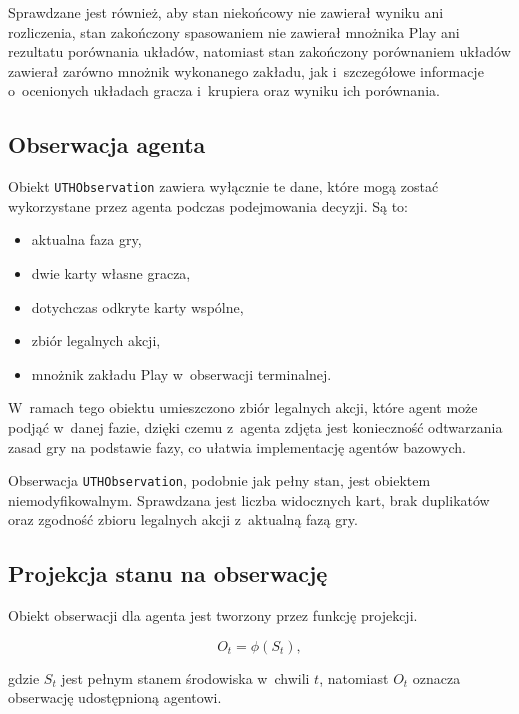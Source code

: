 Sprawdzane jest również, aby stan
niekońcowy nie zawierał wyniku ani rozliczenia, stan zakończony spasowaniem
nie zawierał mnożnika Play ani rezultatu porównania układów, natomiast stan
zakończony porównaniem układów zawierał zarówno mnożnik wykonanego zakładu,
jak i~szczegółowe informacje o~ocenionych układach gracza i~krupiera oraz wyniku ich porównania.

\subsection{Obserwacja agenta}
\label{subsec:uth-observation}

Obiekt \texttt{UTHObservation} zawiera wyłącznie te dane, które mogą zostać
wykorzystane przez agenta podczas podejmowania decyzji. Są to:

\begin{itemize}
    \item aktualna faza gry,
    \item dwie karty własne gracza,
    \item dotychczas odkryte karty wspólne,
    \item zbiór legalnych akcji,
    \item mnożnik zakładu Play w~obserwacji terminalnej.
\end{itemize}

W~ramach tego obiektu umieszczono zbiór legalnych akcji, które agent może podjąć w~danej fazie,
dzięki czemu z~agenta zdjęta jest konieczność odtwarzania zasad gry na podstawie fazy, co
ułatwia implementację agentów bazowych.

Obserwacja \texttt{UTHObservation}, podobnie jak pełny stan, jest obiektem niemodyfikowalnym.
Sprawdzana jest liczba widocznych kart, brak duplikatów oraz zgodność zbioru
legalnych akcji z~aktualną fazą gry.

\subsection{Projekcja stanu na obserwację}
\label{subsec:projekcja-stanu}

Obiekt obserwacji dla agenta jest tworzony przez funkcję projekcji.

\begin{equation}
    O_t = \phi(S_t),
\end{equation}

gdzie \(S_t\) jest pełnym stanem środowiska w~chwili \(t\), natomiast
\(O_t\) oznacza obserwację udostępnioną agentowi.

